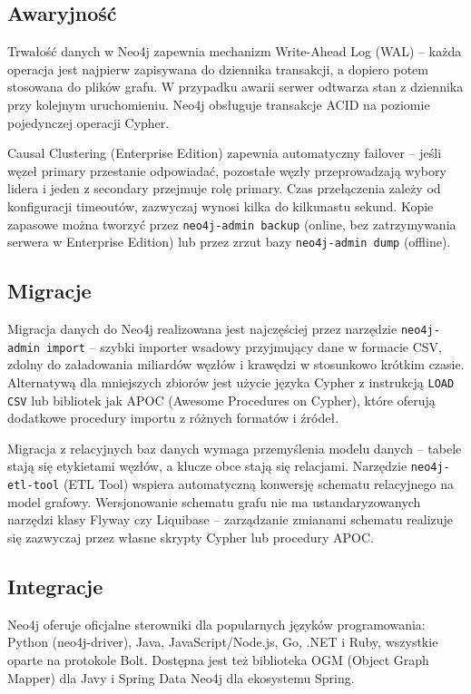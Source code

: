 \subsection{Awaryjność}

Trwałość danych w Neo4j zapewnia mechanizm Write-Ahead Log (WAL) -- każda
operacja jest najpierw zapisywana do dziennika transakcji, a dopiero potem
stosowana do plików grafu. W przypadku awarii serwer odtwarza stan
z dziennika przy kolejnym uruchomieniu. Neo4j obsługuje transakcje ACID
na poziomie pojedynczej operacji Cypher.

Causal Clustering (Enterprise Edition) zapewnia automatyczny failover --
jeśli węzeł primary przestanie odpowiadać, pozostałe węzły przeprowadzają
wybory lidera i jeden z secondary przejmuje rolę primary. Czas przełączenia
zależy od konfiguracji timeoutów, zazwyczaj wynosi kilka do kilkunastu
sekund. Kopie zapasowe można tworzyć przez \texttt{neo4j-admin backup}
(online, bez zatrzymywania serwera w Enterprise Edition) lub przez
zrzut bazy \texttt{neo4j-admin dump} (offline).

\subsection{Migracje}

Migracja danych do Neo4j realizowana jest najczęściej przez narzędzie
\texttt{neo4j-admin import} -- szybki importer wsadowy przyjmujący dane
w formacie CSV, zdolny do załadowania miliardów węzłów i krawędzi
w stosunkowo krótkim czasie. Alternatywą dla mniejszych zbiorów jest
użycie języka Cypher z instrukcją \texttt{LOAD CSV} lub bibliotek jak
APOC (Awesome Procedures on Cypher), które oferują dodatkowe procedury
importu z różnych formatów i źródeł.

Migracja z relacyjnych baz danych wymaga przemyślenia modelu danych --
tabele stają się etykietami węzłów, a klucze obce stają się relacjami.
Narzędzie \texttt{neo4j-etl-tool} (ETL Tool) wspiera automatyczną konwersję
schematu relacyjnego na model grafowy. Wersjonowanie schematu grafu nie ma
ustandaryzowanych narzędzi klasy Flyway czy Liquibase -- zarządzanie zmianami
schematu realizuje się zazwyczaj przez własne skrypty Cypher lub procedury APOC.

\subsection{Integracje}

Neo4j oferuje oficjalne sterowniki dla popularnych języków programowania:
Python (neo4j-driver), Java, JavaScript/Node.js, Go, .NET i Ruby, wszystkie
oparte na protokole Bolt. Dostępna jest też biblioteka OGM (Object Graph
Mapper) dla Javy i Spring Data Neo4j dla ekosystemu Spring.

